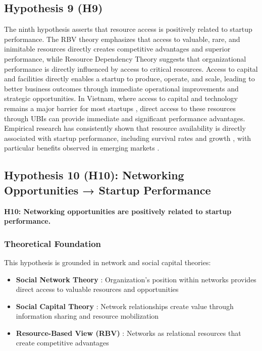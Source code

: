 \documentclass[../Main.tex]{subfiles}
\begin{document}
    \subsection{Hypothesis 9 (H9)}
    The ninth hypothesis asserts that resource access is positively related to startup performance. The RBV theory \cite{barney1991firm} emphasizes that access to valuable, rare, and inimitable resources directly creates competitive advantages and superior performance, while Resource Dependency Theory \cite{pfeffer1978external} suggests that organizational performance is directly influenced by access to critical resources. Access to capital and facilities directly enables a startup to produce, operate, and scale, leading to better business outcomes through immediate operational improvements and strategic opportunities. In Vietnam, where access to capital and technology remains a major barrier for most startups \cite{vietnam_innovation_report_2024}, direct access to these resources through UBIs can provide immediate and significant performance advantages. Empirical research has consistently shown that resource availability is directly associated with startup performance, including survival rates and growth \cite{cooper1994initial}, with particular benefits observed in emerging markets \cite{bruton2010governance}.

    \subsection{Hypothesis 10 (H10): Networking Opportunities → Startup Performance}
    \textbf{H10: Networking opportunities are positively related to startup performance.}

    \subsubsection{Theoretical Foundation}
    This hypothesis is grounded in network and social capital theories:

    \begin{itemize}
        \item \textbf{Social Network Theory} \cite{granovetter1973strength}: Organization's position within networks provides direct access to valuable resources and opportunities
        \item \textbf{Social Capital Theory} \cite{coleman1988social}: Network relationships create value through information sharing and resource mobilization
        \item \textbf{Resource-Based View (RBV)} \cite{barney1991firm}: Networks as relational resources that create competitive advantages
    \end{itemize}
\end{document}
